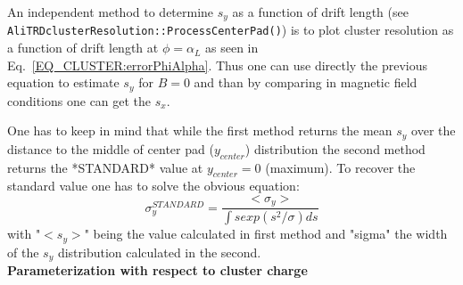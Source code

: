 \documentclass{alicetdr}
\begin{document}
An independent method to determine $s_y$ as a function of drift length (see 
{\tt AliTRDcluster\-Resolution::ProcessCenterPad()}) is to plot cluster resolution as 
a function of drift length at $\phi = \alpha_L$ as seen in 
Eq.~\ref{EQ_CLUSTER:errorPhiAlpha}. Thus one can use directly the previous equation 
to estimate $s_y$ for $B = 0$ and than by comparing in magnetic field conditions one 
can get the $s_x$.

One has to keep in mind that while the first method returns the mean $s_y$ over the 
distance to the middle of center pad ($y_{center}$) distribution the second method 
returns the *STANDARD* value at $y_{center}=0$ (maximum). To recover the standard 
value one has to solve the obvious equation:
\begin{equation}
\sigma_{y}^{STANDARD} = \frac{<\sigma_{y}>}{\int{s exp(s^{2}/\sigma) ds}}
\end{equation}
with "$<s_y>$" being the value calculated in first method and "sigma" the width of 
the $s_y$ distribution calculated in the second.
\\

\noindent
{\bf Parameterization with respect to cluster charge}
\\
\end{document}
